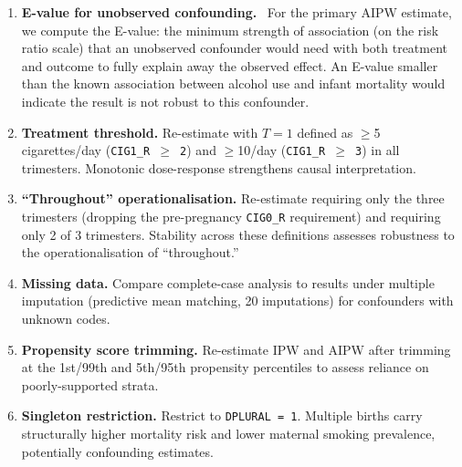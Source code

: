 \documentclass[11pt]{article}
\begin{document}
\begin{enumerate}[noitemsep, topsep=2pt, leftmargin=*]
  \item \textbf{E-value for unobserved confounding.}~\cite{vanderweele2017} For the primary AIPW estimate, we compute the E-value: the minimum strength of association (on the risk ratio scale) that an unobserved confounder would need with both treatment and outcome to fully explain away the observed effect. An E-value smaller than the known association between alcohol use and infant mortality would indicate the result is not robust to this confounder.

  \item \textbf{Treatment threshold.} Re-estimate with $T=1$ defined as $\geq$5 cigarettes/day (\texttt{CIG1\_R\,$\geq$\,2}) and $\geq$10/day (\texttt{CIG1\_R\,$\geq$\,3}) in all trimesters. Monotonic dose-response strengthens causal interpretation.

  \item \textbf{``Throughout'' operationalisation.} Re-estimate requiring only the three trimesters (dropping the pre-pregnancy \texttt{CIG0\_R} requirement) and requiring only 2 of 3 trimesters. Stability across these definitions assesses robustness to the operationalisation of ``throughout.''

  \item \textbf{Missing data.} Compare complete-case analysis to results under multiple imputation (predictive mean matching, 20 imputations) for confounders with unknown codes.

  \item \textbf{Propensity score trimming.} Re-estimate IPW and AIPW after trimming at the 1st/99th and 5th/95th propensity percentiles to assess reliance on poorly-supported strata.

  \item \textbf{Singleton restriction.} Restrict to \texttt{DPLURAL\,=\,1}. Multiple births carry structurally higher mortality risk and lower maternal smoking prevalence, potentially confounding estimates.

\end{enumerate}
\end{document}
